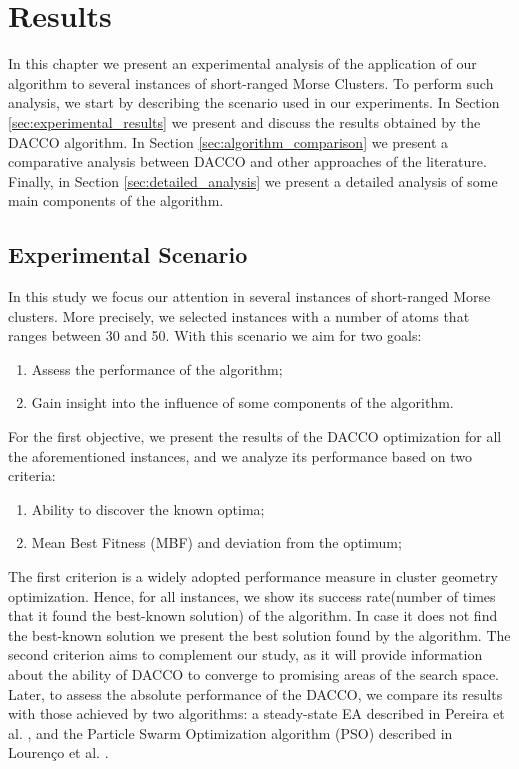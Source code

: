 \chapter{Results}
\label{chap:results}

In this chapter we present an experimental analysis of the application of our algorithm to several instances of short-ranged Morse Clusters. To perform such analysis, we start by describing the scenario used in our experiments. In Section \ref{sec:experimental_results} we present and discuss the results obtained by the DACCO algorithm. In Section \ref{sec:algorithm_comparison} we present a comparative analysis between DACCO and other approaches of the literature. Finally, in Section \ref{sec:detailed_analysis} we present a detailed analysis of some main components of the algorithm.

\section{Experimental Scenario}
\label{sec:experimental_scenario}
In this study we focus our attention in several instances of short-ranged Morse clusters. More precisely, we selected instances with a number of atoms that ranges between 30 and 50. With this scenario we aim for two goals: 
	\begin{enumerate}
		\item Assess the performance of the algorithm;
		\item Gain insight into the influence of some components of the algorithm. 
	\end{enumerate}
	
	For the first objective, we present the results of the DACCO optimization for all the aforementioned instances, and we analyze its performance based on two criteria:
	\begin{enumerate}
		\item Ability to discover the known optima;
		\item Mean Best Fitness (MBF) and deviation from the optimum;
	\end{enumerate}
	The first criterion is a widely adopted performance measure in cluster geometry optimization. Hence, for all instances, we show its success rate(number of times that it found the best-known solution) of the algorithm. In case it does not find the best-known solution we present the best solution found by the algorithm. The second criterion aims to complement our study, as it will provide information about the ability of DACCO to converge to promising areas of the search space.\\
	Later, to assess the absolute performance of the DACCO, we compare its results with those achieved by two algorithms: a steady-state EA described in Pereira et al. \cite{xico09}, and the Particle Swarm Optimization algorithm (PSO) described in Lourenço et al. \cite{lourenco11}.
	
